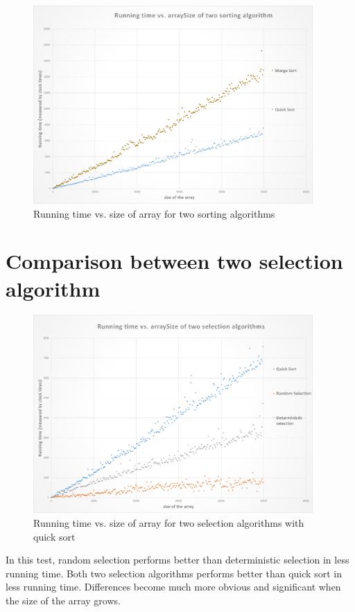 \documentclass[12pt,a4paper]{article}
\theoremstyle{definition}
\begin{document}
\begin{figure}[htbp]
    \centering
    \includegraphics[width=0.95\textwidth]{2.png}
    \caption{Running time vs. size of array for two sorting algorithms}
\end{figure}


\newpage
\section{Comparison between two selection algorithm}
\begin{figure}[htbp]
    \centering
    \includegraphics[width=0.95\textwidth]{3.png}
    \caption{Running time vs. size of array for two selection algorithms with quick sort}
\end{figure}

\par In this test, random selection performs better than deterministic
selection in less running time. Both two selection algorithms performs
better than quick sort in less running time. Differences become much
more obvious and significant when the size of the array grows.
\newpage
\end{document}
